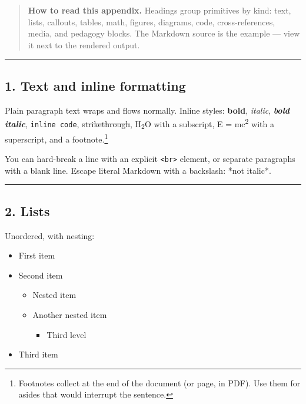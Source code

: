 \documentclass[
]{article}
\providecommand{\tightlist}{%
  \setlength{\itemsep}{0pt}\setlength{\parskip}{0pt}}
\theoremstyle{plain}
\theoremstyle{definition}
\begin{document}
\begin{quote}
\textbf{How to read this appendix.} Headings group primitives by kind:
text, lists, callouts, tables, math, figures, diagrams, code,
cross-references, media, and pedagogy blocks. The Markdown source is the
example --- view it next to the rendered output.
\end{quote}

\begin{center}\rule{0.5\linewidth}{0.5pt}\end{center}

\subsection{1. Text and inline
formatting}\label{text-and-inline-formatting}

Plain paragraph text wraps and flows normally. Inline styles:
\textbf{bold}, \emph{italic}, \textbf{\emph{bold italic}},
\texttt{inline\ code}, \st{strikethrough}, H\textsubscript{2}O with a
subscript, E = mc\textsuperscript{2} with a superscript, and a
footnote.\footnote{Footnotes collect at the end of the document (or
  page, in PDF). Use them for asides that would interrupt the sentence.}

You can hard-break a line with an explicit
\texttt{\textless{}br\textgreater{}} element, or separate paragraphs
with a blank line. Escape literal Markdown with a backslash: *not
italic*.

\begin{center}\rule{0.5\linewidth}{0.5pt}\end{center}

\subsection{2. Lists}\label{lists}

Unordered, with nesting:

\begin{itemize}
\tightlist
\item
  First item
\item
  Second item

  \begin{itemize}
  \tightlist
  \item
    Nested item
  \item
    Another nested item

    \begin{itemize}
    \tightlist
    \item
      Third level
    \end{itemize}
  \end{itemize}
\item
  Third item
\end{itemize}
\end{document}
